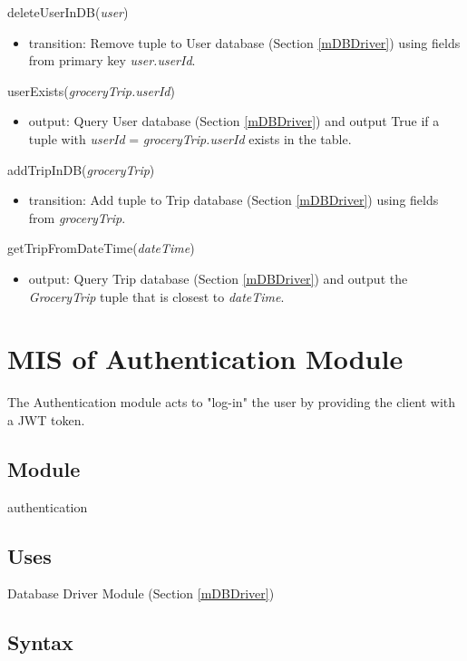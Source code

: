 \documentclass[12pt, titlepage]{article}
\begin{document}
\noindent deleteUserInDB(\textit{user})
\begin{itemize}
\item transition: Remove tuple to User database (Section \ref{mDBDriver}) using fields from primary key \textit{user.userId}.
\end{itemize}

\noindent userExists(\textit{groceryTrip.userId})
\begin{itemize}
\item output: Query User database (Section \ref{mDBDriver}) and output True if a tuple with \textit{userId} = \textit{groceryTrip.userId} exists in the table.
\end{itemize}

\noindent addTripInDB(\textit{groceryTrip})
\begin{itemize}
\item transition: Add tuple to Trip database (Section \ref{mDBDriver}) using fields from \textit{groceryTrip}.
\end{itemize}

\noindent getTripFromDateTime(\textit{dateTime})
\begin{itemize}
\item output: Query Trip database (Section \ref{mDBDriver}) and output the \textit{GroceryTrip} tuple that is closest to \textit{dateTime}.
\end{itemize}

\newpage

\section{MIS of Authentication Module} \label{mAuthentication} 
The Authentication module acts to "log-in" the user by providing the client with a JWT token.

\subsection{Module}

authentication

\subsection{Uses}

Database Driver Module (Section \ref{mDBDriver}) 

\subsection{Syntax}
\end{document}
